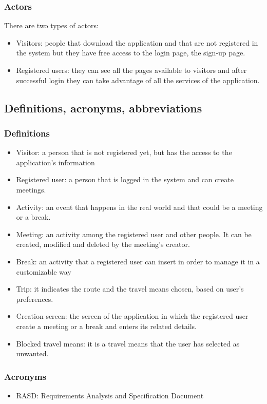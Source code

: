 \documentclass[12pt,titlepage]{article}
\begin{document}
\begin{itemize}
 \end{itemize}
\subsubsection{Actors}\label{RASD}
There are two types of actors:
\begin{itemize}
\item Visitors: people that download the application and that are not registered in the system but they have free access to the login page, the sign-up page.
\item Registered users: they can see all the pages available to visitors and after successful login they can take advantage of all the services of the application.

\end{itemize}


\subsection{Definitions, acronyms, abbreviations}\label{RASD}
\subsubsection{Definitions}\label{RASD}
\begin{itemize}
\item Visitor: a person that is not registered yet, but has the access to the application's information 
\item	Registered user: a person that is logged in the system and can create meetings.
\item	Activity: an event that happens in the real world and that could be a meeting or a break.
\item	Meeting: an activity among the registered user and other people. It can be created, modified and deleted by the meeting's creator. 
\item	Break: an activity that a registered user can insert in order to manage it in a customizable way
\item Trip: it indicates the route and the travel means chosen, based on user's preferences.
\item	Creation screen: the screen of the application in which the registered user create a meeting or a break and enters its related details.
\item Blocked travel means: it is a travel means that the user has selected as unwanted.
\end{itemize}
\subsubsection{Acronyms}\label{RASD}
\begin{itemize}
\item	RASD: Requirements Analysis and Specification Document
\end{itemize}
\end{document}
